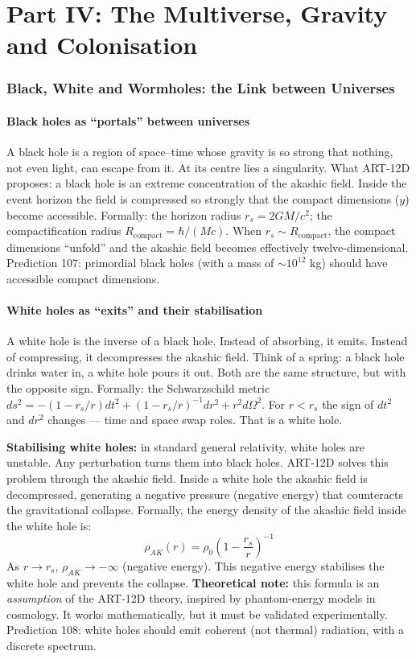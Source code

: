 \part*{Part IV: The Multiverse, Gravity and Colonisation}

\section{Black, White and Wormholes: the Link between Universes}
\subsection{Black holes as ``portals'' between universes}
A black hole is a region of space--time whose gravity is so strong that nothing, not even light, can escape from it. At its centre lies a singularity. What ART-12D proposes: a black hole is an extreme concentration of the akashic field. Inside the event horizon the field is compressed so strongly that the compact dimensions ($y$) become accessible. Formally: the horizon radius $r_s = 2GM/c^2$; the compactification radius $R_{\text{compact}} = \hbar/(Mc)$. When $r_s \sim R_{\text{compact}}$, the compact dimensions ``unfold'' and the akashic field becomes effectively twelve-dimensional. Prediction 107: primordial black holes (with a mass of $\sim 10^{12}$ kg) should have accessible compact dimensions.

\subsection{White holes as ``exits'' and their stabilisation}
A white hole is the inverse of a black hole. Instead of absorbing, it emits. Instead of compressing, it decompresses the akashic field. Think of a spring: a black hole drinks water in, a white hole pours it out. Both are the same structure, but with the opposite sign. Formally: the Schwarzschild metric $ds^2 = -(1-r_s/r)dt^2 + (1-r_s/r)^{-1}dr^2 + r^2 d\Omega^2$. For $r < r_s$ the sign of $dt^2$ and $dr^2$ changes --- time and space swap roles. That is a white hole.

\textbf{Stabilising white holes:} in standard general relativity, white holes are unstable. Any perturbation turns them into black holes. ART-12D solves this problem through the akashic field. Inside a white hole the akashic field is decompressed, generating a negative pressure (negative energy) that counteracts the gravitational collapse. Formally, the energy density of the akashic field inside the white hole is:
\begin{equation}
\rho_{AK}(r) = \rho_0 \left(1 - \frac{r_s}{r}\right)^{-1}
\end{equation}
As $r \to r_s$, $\rho_{AK} \to -\infty$ (negative energy). This negative energy stabilises the white hole and prevents the collapse. \textbf{Theoretical note:} this formula is an \textit{assumption} of the ART-12D theory, inspired by phantom-energy models in cosmology. It works mathematically, but it must be validated experimentally. Prediction 108: white holes should emit coherent (not thermal) radiation, with a discrete spectrum.

